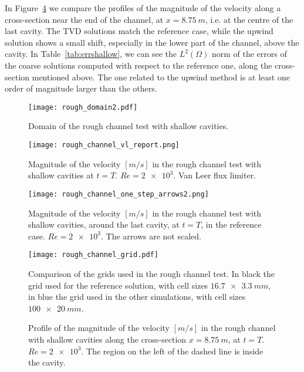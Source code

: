 In Figure~\ref{fig:linecompshallow} we compare the profiles of the magnitude 
of the velocity along a cross-section near the end of the channel, at 
$x=\SI{8.75}{m}$, i.e. at the centre of the last cavity.  The TVD solutions 
match the reference case, while the upwind solution shows a small shift, 
especially in the lower part of the channel, above the cavity. In 
Table~\ref{tab:errshallow}, we can see the 
$L^2(\Omega)$ norm 
of the errors of the coarse solutions computed with respect to the reference 
one, along the cross-section mentioned above. The one related to the 
upwind method is at least one order of magnitude larger than the others. 
\begin{figure}
	\centering
	\texttt{[image: rough\_domain2.pdf]}
	\caption[Domain of the rough channel test with shallow cavities]{Domain of 
	the rough channel test with shallow cavities.}
	\label{fig:roughdom}
\end{figure}
\begin{figure}
	\centering
	\texttt{[image: rough\_channel\_vl\_report.png]}
	\caption[Magnitude of the velocity in the rough channel test with 
	shallow cavities]{Magnitude of the velocity $[\si{m/s}]$ in the 
	rough channel test with shallow cavities at $t=T$. $Re=\num{2e3}$. 
	Van Leer flux limiter.}
	\label{fig:roughchannelvl}
\end{figure}
\begin{figure}
	\centering
	\texttt{[image: rough\_channel\_one\_step\_arrows2.png]}
	\caption[Magnitude of the velocity in the rough channel test with schallo cavities around the last cavity]{Magnitude of the velocity $[\si{m/s}]$ in the rough channel test with shallow cavities, around the last cavity, at $t=T$, in the reference case. $Re=\num{2e3}$. The arrows are not scaled.}
\end{figure}
\begin{figure}
	\centering
	\texttt{[image: rough\_channel\_grid.pdf]}
	\caption[Grid comparison in the rough channel test]{Comparison of the grids used in the rough channel test. In black the grid used for the reference solution, with cell sizes $\SI{16.7x3.3}{mm}$, in blue the grid used in the other simulations, with cell sizes $\SI{100x20}{mm}$.}
	\label{fig:roughchannelgrid}
\end{figure}
\begin{figure}
	\centering
	
	\caption[Profile of the magnitude of the velocity in the rough channel with 
	shallow cavities at $Re=\num{2e3}$]{Profile of the magnitude of the 
	velocity $[\si{m/s}]$ in the rough channel with shallow cavities along the 
	cross-section $x=\SI{8.75}{m}$, at $t=T$. $Re=\num{2e3}$. The region on 
	the left of the dashed line is inside the cavity.}
	\label{fig:linecompshallow}
\end{figure}
